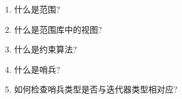 \begin{enumerate}
\item
什么是范围?

\item
什么是范围库中的视图?

\item
什么是约束算法?

\item
什么是哨兵?

\item
如何检查哨兵类型是否与迭代器类型相对应?
\end{enumerate}
